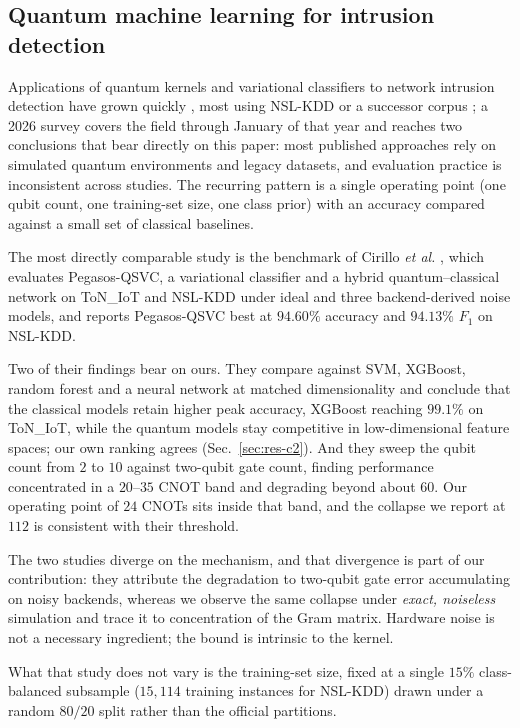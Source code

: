 \subsection{Quantum machine learning for intrusion detection}
\begin{revbody}

Applications of quantum kernels and variational classifiers to network intrusion
detection have grown quickly \cite{ref13,ref14,ref15}, most using NSL-KDD
\cite{ref4} or a successor corpus \cite{ref25}; a 2026 survey \cite{kaissar2026} covers the field through
January of that year and reaches two conclusions that bear directly on this
paper: most published approaches rely on simulated quantum environments and
legacy datasets, and evaluation practice is inconsistent across studies. The
recurring pattern is a single operating point (one qubit count, one
training-set size, one class prior) with an accuracy compared against a small
set of classical baselines.

The most directly comparable study is the benchmark of Cirillo \emph{et al.}
\cite{qmi2026}, which evaluates Pegasos-QSVC, a variational classifier and a
hybrid quantum--classical network on ToN\_IoT and NSL-KDD under ideal and three
backend-derived noise models, and reports Pegasos-QSVC best at $94.60\%$
accuracy and $94.13\%$ $F_1$ on NSL-KDD.

Two of their findings bear on ours. They compare against SVM, XGBoost, random
forest and a neural network at matched dimensionality and conclude that the
classical models retain higher peak accuracy, XGBoost reaching $99.1\%$ on
ToN\_IoT, while the quantum models stay competitive in low-dimensional
feature spaces; our own ranking agrees (Sec.~\ref{sec:res-c2}). And they sweep
the qubit count from $2$ to $10$ against two-qubit gate count, finding
performance concentrated in a $20$--$35$ CNOT band and degrading beyond about
$60$. Our operating point of $24$ CNOTs sits inside that band, and the collapse
we report at $112$ is consistent with their threshold.

The two studies diverge on the mechanism, and that divergence is part of our
contribution: they attribute the degradation to two-qubit gate error
accumulating on noisy backends, whereas we observe the same collapse under
\emph{exact, noiseless} simulation and trace it to concentration of the Gram
matrix. Hardware noise is not a necessary ingredient; the bound is intrinsic to
the kernel.

What that study does not vary is the training-set size, fixed at a single $15\%$
class-balanced subsample ($15{,}114$ training instances for NSL-KDD) drawn under
a random $80/20$ split rather than the official partitions.
\end{revbody}

